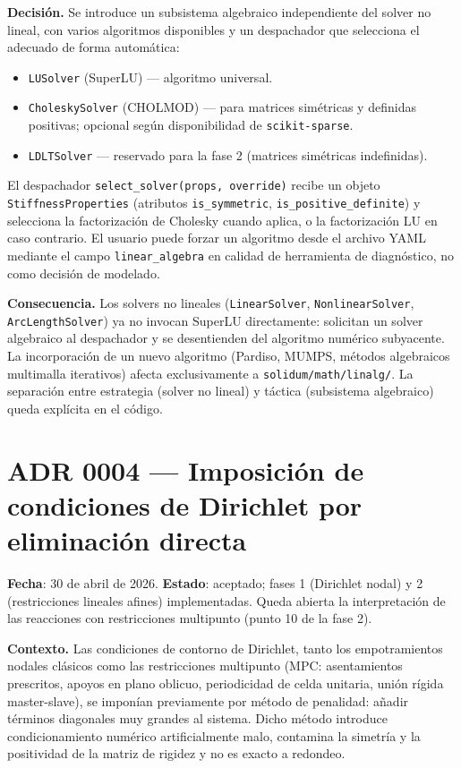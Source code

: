 \documentclass[11pt,oneside]{report}
\begin{document}
\textbf{Decisión.} Se introduce un subsistema algebraico independiente del solver no lineal, con varios algoritmos disponibles y un despachador que selecciona el adecuado de forma automática:

\begin{itemize}
  \item \texttt{LUSolver} (SuperLU) --- algoritmo universal.
  \item \texttt{CholeskySolver} (CHOLMOD) --- para matrices simétricas y definidas positivas; opcional según disponibilidad de \texttt{scikit-sparse}.
  \item \texttt{LDLTSolver} --- reservado para la fase 2 (matrices simétricas indefinidas).
\end{itemize}

El despachador \texttt{select\_\allowbreak{}solver(props, override)} recibe un objeto \texttt{StiffnessProperties} (atributos \texttt{is\_symmetric}, \texttt{is\_\allowbreak{}positive\_\allowbreak{}definite}) y selecciona la factorización de Cholesky cuando aplica, o la factorización LU en caso contrario. El usuario puede forzar un algoritmo desde el archivo YAML mediante el campo \texttt{linear\_algebra} en calidad de herramienta de diagnóstico, no como decisión de modelado.

\textbf{Consecuencia.} Los solvers no lineales (\texttt{LinearSolver}, \texttt{NonlinearSolver}, \texttt{ArcLengthSolver}) ya no invocan SuperLU directamente: solicitan un solver algebraico al despachador y se desentienden del algoritmo numérico subyacente. La incorporación de un nuevo algoritmo (Pardiso, MUMPS, métodos algebraicos multimalla iterativos) afecta exclusivamente a \texttt{solidum/\allowbreak{}math/\allowbreak{}linalg/\allowbreak{}}. La separación entre estrategia (solver no lineal) y táctica (subsistema algebraico) queda explícita en el código.

\section{ADR 0004 --- Imposición de condiciones de Dirichlet por eliminación directa}
\label{adr:0004}

\textbf{Fecha}: 30 de abril de 2026. \textbf{Estado}: aceptado; fases 1 (Dirichlet nodal) y 2 (restricciones lineales afines) implementadas. Queda abierta la interpretación de las reacciones con restricciones multipunto (punto 10 de la fase 2).

\textbf{Contexto.} Las condiciones de contorno de Dirichlet, tanto los empotramientos nodales clásicos como las restricciones multipunto (MPC: asentamientos prescritos, apoyos en plano oblicuo, periodicidad de celda unitaria, unión rígida master-slave), se imponían previamente por método de penalidad: añadir términos diagonales muy grandes al sistema. Dicho método introduce condicionamiento numérico artificialmente malo, contamina la simetría y la positividad de la matriz de rigidez y no es exacto a redondeo.
\end{document}
